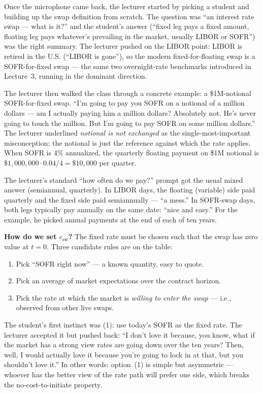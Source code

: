 Once the microphone came back, the lecturer started by picking a
student and building up the swap definition from scratch. The question was
``an interest rate swap --- what is it?'' and the student's answer
(``fixed leg pays a fixed amount, floating leg pays whatever's prevailing
in the market, usually LIBOR or SOFR'') was the right summary. The
lecturer pushed on the LIBOR point: LIBOR is retired in the U.S. (``LIBOR
is gone''), so the modern fixed-for-floating swap is a SOFR-for-fixed
swap --- the same two overnight-rate benchmarks introduced in Lecture~3,
running in the dominant direction.

The lecturer then walked the class through a concrete example: a
\$1M-notional SOFR-for-fixed swap. ``I'm going to pay you SOFR on a
notional of a million dollars --- am I actually paying him a million
dollars? Absolutely not. He's never going to touch the million. But I'm
going to pay SOFR on some million dollars.'' The lecturer underlined
\emph{notional is not exchanged} as the single-most-important
misconception; the notional is just the reference against which the rate
applies. When SOFR is 4\% annualized, the quarterly floating payment on
\$1M notional is $\$1{,}000{,}000 \cdot 0.04/4 = \$10{,}000$ per quarter.

The lecturer's standard ``how often do we pay?'' prompt got the usual
mixed answer (semiannual, quarterly). In LIBOR days, the floating
(variable) side paid quarterly and the fixed side paid semiannually --- ``a
mess.'' In SOFR-swap days, both legs typically pay annually on the same
date: ``nice and easy.'' For the example, he picked annual payments at the
end of each of ten years.

\begin{keyblock}
\textbf{How do we set $c_{\text{sw}}$?} The fixed rate must be chosen such
that the swap has zero value at $t=0$. Three candidate rules are on the
table:
\begin{enumerate}
  \item Pick ``SOFR right now'' --- a known quantity, easy to quote.
  \item Pick an average of market expectations over the contract horizon.
  \item Pick the rate at which the market is \emph{willing to enter the
        swap} --- i.e., observed from other live swaps.
\end{enumerate}
\end{keyblock}

The student's first instinct was (1): use today's SOFR as the fixed rate.
The lecturer accepted it but pushed back: ``I don't love it because, you
know, what if the market has a strong view rates are going down over the
ten years? Then, well, I would actually love it because you're going to
lock in at that, but you shouldn't love it.'' In other words: option~(1)
is simple but asymmetric --- whoever has the better view of the rate path
will prefer one side, which breaks the no-cost-to-initiate property.

